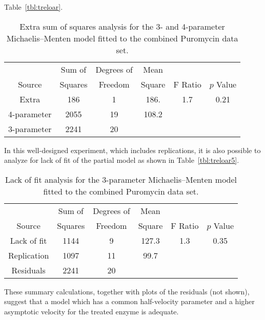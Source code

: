 \begin{example}
Table~\ref{tbl:treloar}.
\begin{table}
  \caption{
  Extra sum of squares analysis for the 3- and 4-parameter
  Michaelis--Menten model fitted to the combined Puromycin data set.
  }\label{tbl&treloar}
  \begin{center}
    \begin{tabular}{cccccc}\hline
      & \multicolumn{1}{c}{Sum of} & \multicolumn{1}{c}{Degrees of}
      &\multicolumn{1}{c}{Mean}\\ \multicolumn{1}{c}{Source} &
      \multicolumn{1}{c}{Squares} &\multicolumn{1}{c}{Freedom} &
      \multicolumn{1}{c}{Square} & \multicolumn{1}{c}{F Ratio}
      &\multicolumn{1}{c}{$p$ Value}\\
      \hline Extra&186&1&186.&1.7&0.21\\
      4-parameter&2055&19&108.2\\
      3-parameter&2241&20\\ \hline
    \end{tabular}
  \end{center}
\end{table}

In this well-designed experiment, which includes replications, it
is also possible to analyze for lack of fit of the partial model as
shown in Table~\ref{tbl:treloar5}.
\begin{table}
  \caption{
  Lack of fit analysis for the 3-parameter Michaelis--Menten model
  fitted to the combined Puromycin data set.  }\label{tbl&treloar5}
  \begin{center}
    \begin{tabular}{cccccc}
      & \multicolumn{1}{c}{Sum of} & \multicolumn{1}{c}{Degrees
      of} & \multicolumn{1}{c}{Mean}\\ \multicolumn{1}{c}{Source} &
      \multicolumn{1}{c}{Squares} & \multicolumn{1}{c}{Freedom} &
      \multicolumn{1}{c}{Square} & \multicolumn{1}{c}{F Ratio} &
      \multicolumn{1}{c}{$p$ Value}\\ \hline
      Lack of fit &1144&9&127.3&1.3&0.35\\
      Replication&1097&11&99.7\\ \hline
      Residuals&2241&20\\ \hline
    \end{tabular}
  \end{center}
\end{table}
These summary calculations, together with plots of the residuals
(not shown), suggest that a model which has a common
half-velocity parameter and a higher asymptotic velocity for
the treated enzyme is adequate.
\end{example}

